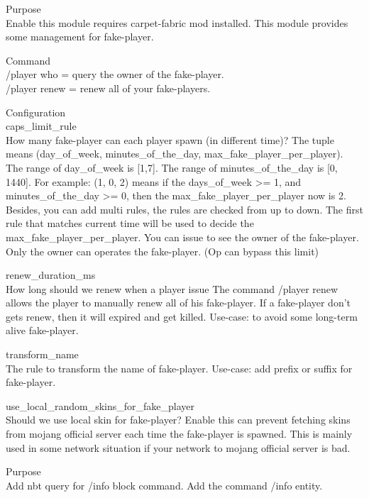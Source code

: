 
Purpose\\
Enable this module requires carpet-fabric mod installed.
This module provides some management for fake-player.

Command\\
/player who = query the owner of the fake-player.\\
/player renew = renew all of your fake-players.

Configuration\\
caps\_limit\_rule\\
How many fake-player can each player spawn (in different time)?
The tuple means (day\_of\_week, minutes\_of\_the\_day, max\_fake\_player\_per\_player).
The range of day\_of\_week is [1,7].
The range of minutes\_of\_the\_day is [0, 1440].
For example: (1, 0, 2) means if the days\_of\_week >= 1, and minutes\_of\_the\_day >= 0, then the max\_fake\_player\_per\_player now is 2.
Besides, you can add multi rules, the rules are checked from up to down.
The first rule that matches current time will be used to decide the max\_fake\_player\_per\_player.
You can issue  to see the owner of the fake-player.
Only the owner can operates the fake-player. (Op can bypass this limit)

renew\_duration\_ms\\
How long should we renew when a player issue 
The command /player renew allows the player to manually renew all of his fake-player.
If a fake-player don't gets renew, then it will expired and get killed.
Use-case: to avoid some long-term alive fake-player.

transform\_name\\
The rule to transform the name of fake-player.
Use-case: add prefix or suffix for fake-player.

use\_local\_random\_skins\_for\_fake\_player\\
Should we use local skin for fake-player?
Enable this can prevent fetching skins from mojang official server each time the fake-player is spawned.
This is mainly used in some network situation if your network to mojang official server is bad.


Purpose\\
Add nbt query for /info block command.
Add the command /info entity.



